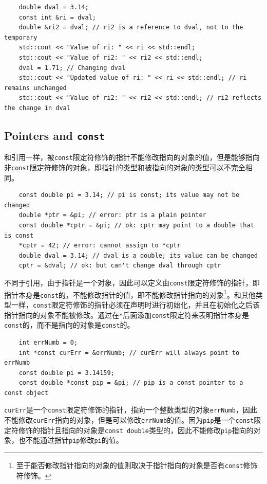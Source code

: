 \begin{verbatim}
    double dval = 3.14;
    const int &ri = dval;
    double &ri2 = dval; // ri2 is a reference to dval, not to the temporary
    std::cout << "Value of ri: " << ri << std::endl;
    std::cout << "Value of ri2: " << ri2 << std::endl;
    dval = 1.71; // Changing dval
    std::cout << "Updated value of ri: " << ri << std::endl; // ri remains unchanged
    std::cout << "Value of ri2: " << ri2 << std::endl; // ri2 reflects the change in dval
\end{verbatim}

\subsection{Pointers and \texttt{const}}\label{sec:cpp-const-pointer}
和引用一样，被\texttt{const}限定符修饰的指针不能修改指向的对象的值，但是能够指向非\texttt{const}限定符修饰的对象，即指针的类型和被指向的对象的类型可以不完全相同。

\begin{verbatim}
    const double pi = 3.14; // pi is const; its value may not be changed
    double *ptr = &pi; // error: ptr is a plain pointer
    const double *cptr = &pi; // ok: cptr may point to a double that is const
    *cptr = 42; // error: cannot assign to *cptr
    double dval = 3.14; // dval is a double; its value can be changed
    cptr = &dval; // ok: but can't change dval through cptr
\end{verbatim}

不同于引用，由于指针是一个对象，因此可以定义由\texttt{const}限定符修饰的指针，即指针本身是\texttt{const}的，不能修改指针的值，即不能修改指针指向的对象\footnote{至于能否修改指针指向的对象的值则取决于指针指向的对象是否有\texttt{const}修饰符修饰。}。和其他类型一样，\texttt{const}限定符修饰的指针必须在声明时进行初始化，并且在初始化之后该指针指向的对象不能被修改。通过在\texttt{*}后面添加\texttt{const}限定符来表明指针本身是\texttt{const}的，而不是指向的对象是\texttt{const}的。

\begin{verbatim}
    int errNumb = 0;
    int *const curErr = &errNumb; // curErr will always point to errNumb
    const double pi = 3.14159;
    const double *const pip = &pi; // pip is a const pointer to a const object
\end{verbatim}

\texttt{curErr}是一个\texttt{const}限定符修饰的指针，指向一个整数类型的对象\texttt{errNumb}，因此不能修改\texttt{curErr}指向的对象，但是可以修改\texttt{errNumb}的值。因为\texttt{pip}是一个\texttt{const}限定符修饰的指针且指向的对象是\texttt{const double}类型的，因此不能修改\texttt{pip}指向的对象，也不能通过指针\texttt{pip}修改\texttt{pi}的值。

